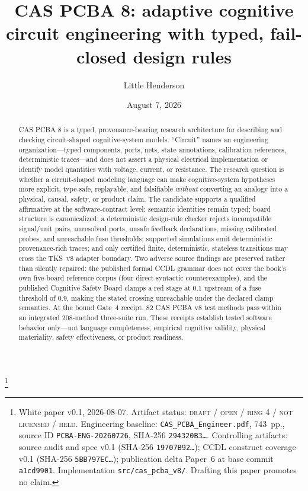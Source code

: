 \documentclass[11pt]{amsart}
\theoremstyle{definition}
\theoremstyle{remark}
\begin{document}
\title[CAS PCBA 8: adaptive cognitive circuit engineering]{CAS PCBA 8: adaptive cognitive circuit engineering with typed, fail-closed design rules}
\author{Little Henderson}
\thanks{White paper v0.1, 2026-08-07. Artifact status: \textsc{draft / open / ring 4 / not licensed / held}. Engineering baseline: \texttt{CAS\_PCBA\_Engineer.pdf}, 743~pp., source ID \texttt{PCBA-ENG-20260726}, SHA-256 \texttt{294320B3\ldots}. Controlling artifacts: source audit and spec v0.1 (SHA-256 \texttt{19707B92\ldots}); CCDL construct coverage v0.1 (SHA-256 \texttt{5BB797EC\ldots}); publication delta Paper~6 at base commit \texttt{a1cd9901}. Implementation \texttt{src/cas\_pcba\_v8/}. Drafting this paper promotes no claim.}
\date{August 7, 2026}

\begin{abstract}
CAS PCBA 8 is a typed, provenance-bearing research architecture for describing and checking circuit-shaped cognitive-system models. ``Circuit'' names an engineering organization---typed components, ports, nets, state annotations, calibration references, deterministic traces---and does not assert a physical electrical implementation or identify model quantities with voltage, current, or resistance. The research question is whether a circuit-shaped modeling language can make cognitive-system hypotheses more explicit, type-safe, replayable, and falsifiable \emph{without} converting an analogy into a physical, causal, safety, or product claim. The candidate supports a qualified affirmative at the software-contract level: semantic identities remain typed; board structure is canonicalized; a deterministic design-rule checker rejects incompatible signal/unit pairs, unresolved ports, unsafe feedback declarations, missing calibrated probes, and unreachable fuse thresholds; supported simulations emit deterministic provenance-rich traces; and only certified finite, deterministic, stateless transitions may cross the TKS~v8 adapter boundary. Two adverse source findings are preserved rather than silently repaired: the published formal CCDL grammar does not cover the book's own five-board reference corpus (four direct syntactic counterexamples), and the published Cognitive Safety Board clamps a red stage at $0.1$ upstream of a fuse threshold of $0.9$, making the stated crossing unreachable under the declared clamp semantics. At the bound Gate~4 receipt, 82 CAS PCBA v8 test methods pass within an integrated 208-method three-suite run. These receipts establish tested software behavior only---not language completeness, empirical cognitive validity, physical materiality, safety effectiveness, or product readiness.
\end{abstract}
\end{document}
